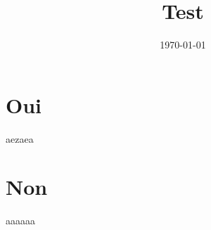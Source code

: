 \documentclass{article}
\date{\today}
\title{Test\\\medskip
\large  }
\begin{document}
\maketitle
\tableofcontents



\section{Oui}
\label{sec:orga9bedd1}
aezaea
\section{Non}
\label{sec:org9416834}
aaaaaa
\end{document}
